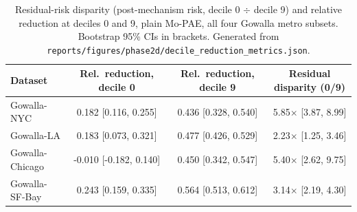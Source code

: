 \begin{table}[t]
\centering
\caption{Residual-risk disparity (post-mechanism risk, decile 0 $\div$ decile 9) and relative reduction at deciles 0 and 9, plain Mo-PAE, all four Gowalla metro subsets. Bootstrap 95\% CIs in brackets. Generated from \texttt{reports/figures/phase2d/decile\_reduction\_metrics.json}.}
\label{tab:gowalla-disparate-risk}
\small
\begin{tabular}{@{}lccc@{}}
\toprule
Dataset & Rel.\ reduction, decile 0 & Rel.\ reduction, decile 9 & Residual disparity (0/9) \\
\midrule
Gowalla-NYC & 0.182 [0.116, 0.255] & 0.436 [0.328, 0.540] & 5.85$\times$ [3.87, 8.99] \\
Gowalla-LA & 0.183 [0.073, 0.321] & 0.477 [0.426, 0.529] & 2.23$\times$ [1.25, 3.46] \\
Gowalla-Chicago & -0.010 [-0.182, 0.140] & 0.450 [0.342, 0.547] & 5.40$\times$ [2.62, 9.75] \\
Gowalla-SF-Bay & 0.243 [0.159, 0.335] & 0.564 [0.513, 0.612] & 3.14$\times$ [2.19, 4.30] \\
\bottomrule
\end{tabular}
\end{table}
